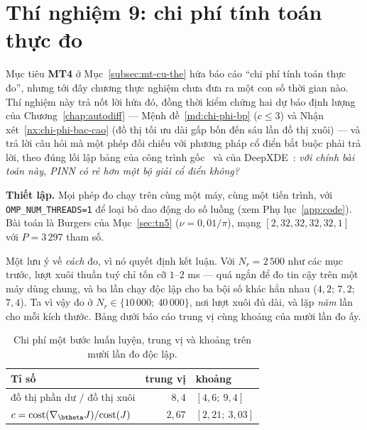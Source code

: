 \section{Thí nghiệm 9: chi phí tính toán thực đo}
\label{sec:tn9}

\begin{thinghiem}
\label{tn:chiphi}
Mục tiêu \textbf{MT4} ở Mục~\ref{subsec:mt-cu-the} hứa báo cáo ``chi phí
tính toán thực đo'', nhưng tới đây chương thực nghiệm chưa đưa ra một con số
thời gian nào. Thí nghiệm này trả nốt lời hứa đó, đồng thời kiểm chứng hai dự
báo định lượng của Chương~\ref{chap:autodiff} --- Mệnh đề~\ref{md:chi-phi-bp}
($c \le 3$) và Nhận xét~\ref{nx:chi-phi-bac-cao} (đồ thị tối ưu dài gấp bốn đến
sáu lần đồ thị xuôi) --- và trả lời câu hỏi mà một phép đối chiếu với phương
pháp cổ điển bắt buộc phải trả lời, theo đúng lối lập bảng của công trình
gốc~\cite{raissi2019} và của DeepXDE~\cite{lu2021}: \emph{với chính bài toán
này, PINN có rẻ hơn một bộ giải cổ điển không?}
\end{thinghiem}

\textbf{Thiết lập.} Mọi phép đo chạy trên cùng một máy, cùng một tiến trình, với
\texttt{OMP\_NUM\_THREADS=1} để loại bỏ dao động do số luồng
(xem Phụ lục~\ref{app:code}). Bài toán là Burgers của Mục~\ref{sec:tn5}
($\nu = 0{,}01/\pi$), mạng $[2, 32, 32, 32, 32, 1]$ với $P = 3\,297$ tham số.

Một lưu ý về \emph{cách} đo, vì nó quyết định kết luận. Với $N_r = 2\,500$ như
các mục trước, lượt xuôi thuần tuý chỉ tốn cỡ $1$--$2$ ms --- quá ngắn để đo tin
cậy trên một máy dùng chung, và ba lần chạy độc lập cho ba bội số khác hẳn nhau
($4{,}2$; $7{,}2$; $7{,}4$). Ta vì vậy đo ở $N_r \in \{10\,000;\ 40\,000\}$, nơi
lượt xuôi đủ dài, và lặp \emph{năm} lần cho mỗi kích thước. Bảng dưới báo cáo
trung vị cùng khoảng của mười lần đo ấy.

\begin{table}[H]
\centering
\caption[Chi phí một bước huấn luyện PINN]{Chi phí một bước huấn luyện, trung vị
và khoảng trên mười lần đo độc lập.}
\label{tab:tn9-buoc}
\small
\begin{tabular}{@{}l r l@{}}
\toprule
\textbf{Tỉ số} & \textbf{trung vị} & \textbf{khoảng} \\
\midrule
đồ thị phần dư $/$ đồ thị xuôi
  & $8{,}4$ & $[4{,}6;\ 9{,}4]$ \\
$c = \mathrm{cost}(\nabla_{\btheta}J) / \mathrm{cost}(J)$
  & $2{,}67$ & $[2{,}21;\ 3{,}03]$ \\
\bottomrule
\end{tabular}
\end{table}

